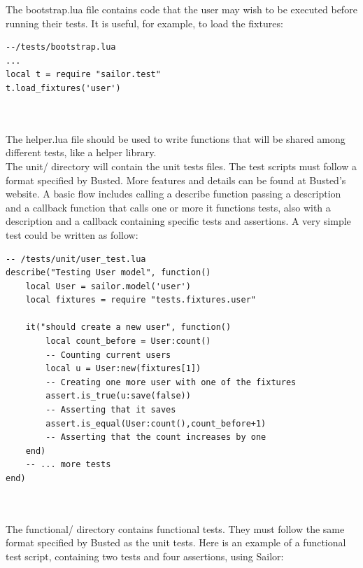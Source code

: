 \documentclass{article}
\begin{document}
The bootstrap.lua file contains code that the user may wish to be executed before running their tests. It is useful, for example, to load the fixtures:\\

\begin{lstlisting}[frame=single]
--/tests/bootstrap.lua
...
local t = require "sailor.test"
t.load_fixtures('user') 
\end{lstlisting}\\\\

The helper.lua file should be used to write functions that will be shared among different tests, like a helper library.\\

The unit/ directory will contain the unit tests files. The test scripts must follow a format specified by Busted. More features and details can be found at Busted’s website. A basic flow includes calling a describe function passing a description and a callback function that calls one or more it functions tests, also with a description and a callback containing specific tests and assertions. A very simple test could be written as follow:\\

\begin{lstlisting}[frame=single]
 -- /tests/unit/user_test.lua 
describe("Testing User model", function()
    local User = sailor.model('user')
    local fixtures = require "tests.fixtures.user"     

    it("should create a new user", function()
        local count_before = User:count() 
        -- Counting current users
        local u = User:new(fixtures[1])   
        -- Creating one more user with one of the fixtures
        assert.is_true(u:save(false))    
        -- Asserting that it saves
        assert.is_equal(User:count(),count_before+1)
        -- Asserting that the count increases by one
    end)
    -- ... more tests
end)
\end{lstlisting}\\\\

The functional/ directory contains functional tests. They must follow the same format specified by Busted as the unit tests. Here is an example of a functional test script, containing two tests and four assertions, using Sailor:\\
\end{document}
